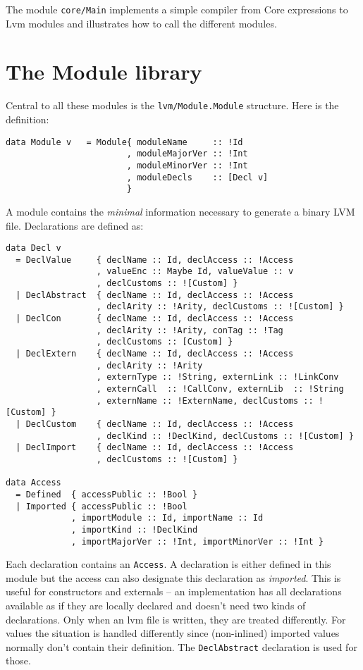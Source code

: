 \documentclass[a4paper,dvips]{article}
\newcommand{\code}[1]{\texttt{#1}}
\begin{document}
The module \code{core/Main} implements a simple compiler from Core expressions
to Lvm modules and illustrates how to call the different modules.


\section{The Module library}

Central to all these modules is the \code{lvm/Module.Module} structure. Here
is the definition:
\begin{verbatim}
data Module v   = Module{ moduleName     :: !Id
                        , moduleMajorVer :: !Int
                        , moduleMinorVer :: !Int
                        , moduleDecls    :: [Decl v]
                        }
 \end{verbatim}

A module contains the \emph{minimal} information necessary to generate
a binary LVM file. Declarations are defined as:

{\small
\begin{verbatim}
data Decl v     
  = DeclValue     { declName :: Id, declAccess :: !Access
                  , valueEnc :: Maybe Id, valueValue :: v
                  , declCustoms :: ![Custom] }
  | DeclAbstract  { declName :: Id, declAccess :: !Access
                  , declArity :: !Arity, declCustoms :: ![Custom] }
  | DeclCon       { declName :: Id, declAccess :: !Access
                  , declArity :: !Arity, conTag :: !Tag
                  , declCustoms :: [Custom] }
  | DeclExtern    { declName :: Id, declAccess :: !Access
                  , declArity :: !Arity
                  , externType :: !String, externLink :: !LinkConv
                  , externCall  :: !CallConv, externLib  :: !String
                  , externName :: !ExternName, declCustoms :: ![Custom] } 
  | DeclCustom    { declName :: Id, declAccess :: !Access
                  , declKind :: !DeclKind, declCustoms :: ![Custom] }
  | DeclImport    { declName :: Id, declAccess :: !Access
                  , declCustoms :: ![Custom] }

data Access
  = Defined  { accessPublic :: !Bool }
  | Imported { accessPublic :: !Bool
             , importModule :: Id, importName :: Id
             , importKind :: !DeclKind
             , importMajorVer :: !Int, importMinorVer :: !Int }
\end{verbatim}}

Each declaration contains an \code{Access}. A declaration is either defined
in this module but the
access can also designate this declaration as \emph{imported}. This is useful for
constructors and externals -- an implementation has all declarations available
as if they are locally declared and doesn't need two kinds of declarations.
Only when an lvm file is written, they are treated differently.
For values the situation is
handled differently since (non-inlined) imported values normally don't contain
their definition. The \code{DeclAbstract} declaration is used for those.
\end{document}
